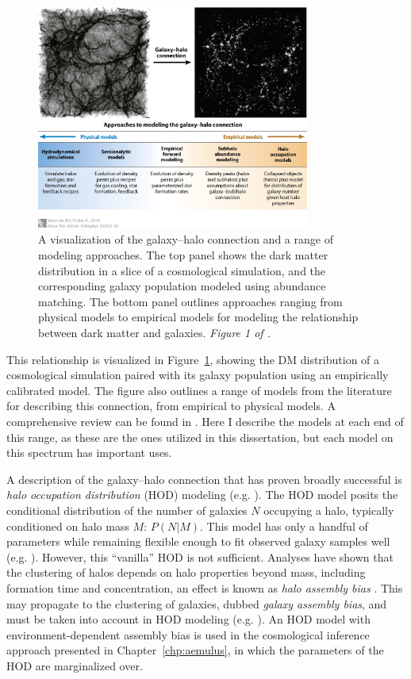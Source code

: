 \begin{figure}
    \centering
    \includegraphics[width=0.8\textwidth]{galhalo.jpg}
    \caption{A visualization of the galaxy--halo connection and a range of modeling approaches. The top panel shows the dark matter distribution in a slice of a cosmological simulation, and the corresponding galaxy population modeled using abundance matching. The bottom panel outlines approaches ranging from physical models to empirical models for modeling the relationship between dark matter and galaxies. \emph{Figure 1 of \cite{wechsler_connection_2018}.}}
    \label{fig:galhalo}
\end{figure}

This relationship is visualized in Figure~\ref{fig:galhalo}, showing the DM distribution of a cosmological simulation paired with its galaxy population using an empirically calibrated model.
The figure also outlines a range of models from the literature for describing this connection, from empirical to physical models.
A comprehensive review can be found in \cite{WechslerTinker2018}.
Here I describe the models at each end of this range, as these are the ones utilized in this dissertation, but each model on this spectrum has important uses.

A description of the galaxy--halo connection that has proven broadly successful is \emph{halo occupation distribution} (HOD) modeling (e.g. \citealt{peacock_halo_2000,Seljak2000,BerlindWeinberg2002}). 
The HOD model posits the conditional distribution of the number of galaxies $N$ occupying a halo, typically conditioned on halo mass $M$: $P(N|M)$.
This model has only a handful of parameters while remaining flexible enough to fit observed galaxy samples well (e.g. \citealt{Zheng2005,reddick_connection_2013}).
However, this ``vanilla'' HOD is not sufficient.
Analyses have shown that the clustering of halos depends on halo properties beyond mass, including formation time and concentration, an effect is known as \emph{halo assembly bias} \citep{wechsler_concentrations_2002, Wechsler2006,mao_beyond_2018}.
This may propagate to the clustering of galaxies, dubbed \emph{galaxy assembly bias}, and must be taken into account in HOD modeling (e.g. \citealt{Tinker2008,hearin_introducing_2016}).
An HOD model with environment-dependent assembly bias is used in the cosmological inference approach presented in Chapter~\ref{chp:aemulus}, in which the parameters of the HOD are marginalized over.

